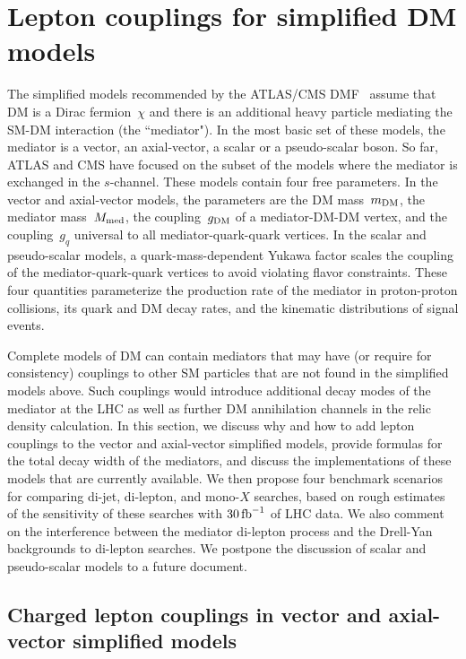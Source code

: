 \documentclass[review]{elsarticle}
\newcommand{\mDM}{\ensuremath{m_{\rm{DM}}}\xspace}
\newcommand{\mmed}{\ensuremath{M_{\rm{med}}}\xspace}
\newcommand{\gDM}{\ensuremath{g_{\rm{DM}}}\xspace}
\newcommand{\gq}{\ensuremath{g_q}\xspace}
\begin{document}

\section{Lepton couplings for simplified DM models}
\label{sec:models}

The simplified models recommended by the ATLAS/CMS DMF~\cite{Abercrombie:2015wmb} assume that DM is a Dirac fermion~$\chi$ and there is an additional heavy particle mediating the SM-DM interaction (the ``mediator"). In the most basic set of these models, the mediator is a vector, an axial-vector, a scalar or a pseudo-scalar boson. So far, ATLAS and CMS have focused on the subset of the models where the mediator is exchanged in the $s$-channel. These models contain four free parameters. In the vector and axial-vector models, the parameters are the DM mass~$\mDM$, the mediator mass~$\mmed$, the coupling~$\gDM$ of a mediator-DM-DM vertex, and the coupling~$\gq$ universal to all mediator-quark-quark vertices. In the scalar and pseudo-scalar models, a quark-mass-dependent Yukawa factor scales the coupling of the mediator-quark-quark vertices to avoid violating flavor constraints. These four quantities parameterize the production rate of the mediator in proton-proton collisions, its quark and DM decay rates, and the kinematic distributions of signal events.

Complete models of DM can contain mediators that may have (or require for consistency) couplings to other SM particles that are not found in the simplified models above. Such couplings would introduce additional decay modes of the mediator at the LHC as well as further DM annihilation channels in the relic density calculation. In this section, we discuss why and how to add lepton couplings to the vector and axial-vector simplified models, provide formulas for the total decay width of the mediators, and discuss the implementations of these models that are currently available. We then propose four benchmark scenarios for comparing di-jet, di-lepton, and mono-$X$ searches, based on rough estimates of the sensitivity of these searches with $30 \, {\rm fb}^{-1}$ of LHC data. We also comment on the interference between the mediator di-lepton process and the Drell-Yan backgrounds to di-lepton searches. We postpone the discussion of scalar and pseudo-scalar models to a future document. 


\subsection{Charged lepton couplings in vector and axial-vector simplified models}
\label{sub:vecAxial}
\end{document}
